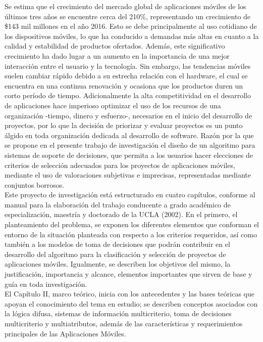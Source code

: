 \introduccion
Se estima que el crecimiento del mercado global de aplicaciones móviles de los últimos tres años se encuentre cerca del 210\%, representando un crecimiento de \$143 mil millones en el año 2016.  Esto se debe principalmente al uso cotidiano de los dispositivos móviles, lo que ha conducido a demandas más altas en cuanto a la calidad y estabilidad de productos ofertados. Además, este significativo crecimiento ha dado lugar a un aumento en la importancia de una mejor interacción entre el usuario y la tecnología. Sin embargo, las tendencias móviles suelen cambiar rápido debido a su estrecha relación con el hardware, el cual se encuentra en una continua renovación y ocasiona que los productos duren un corto período de tiempo. Adicionalmente la alta competitividad en el desarrollo de aplicaciones hace imperioso optimizar el uso de los recursos de una organización -tiempo, dinero y esfuerzo-, necesarios en el inicio del desarrollo de proyectos, por lo que la decisión de priorizar y evaluar proyectos es un punto álgido en toda organización dedicada al desarrollo de software. Razón por la que se propone en el presente trabajo de investigación el diseño de un algoritmo para sistemas de soporte de decisiones, que permita a los usuarios hacer elecciones de  criterios de selección adecuados para los proyectos de aplicaciones móviles, mediante el uso de valoraciones subjetivas e imprecisas, representadas mediante conjuntos borrosos.\\

Este proyecto de investigación está estructurado en cuatro capítulos, conforme al manual para la elaboración del trabajo conducente a grado académico de especialización, maestría y doctorado de la UCLA (2002). En el primero, el planteamiento del problema, se exponen los diferentes elementos que conforman el entorno de la situación planteada con respecto a los criterios requeridos, así como también a los modelos de toma de decisiones que podrán contribuir en el desarrollo del algoritmo para la clasificación y selección de proyectos de aplicaciones móviles. Igualmente, se describen los objetivos del mismo, la justificación,  importancia y alcance, elementos importantes que sirven de base y guía en toda investigación.\\

El Capítulo II, marco teórico, inicia con los antecedentes y las bases teóricas que apoyan el conocimiento del tema en estudio; se describen conceptos asociados con la lógica difusa, sistemas de información multicriterio, toma de decisiones multicriterio y multiatributos, además de las características y requerimientos principales de las Aplicaciones Móviles.\\

